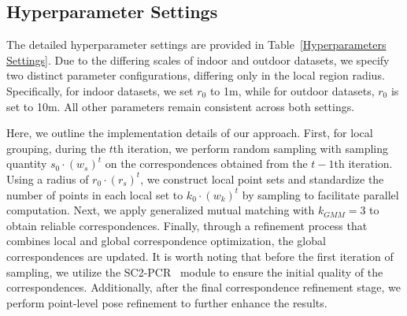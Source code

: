 \subsection{Hyperparameter Settings}

\begin{table}[htbp]
    \centering
    \caption{Hyperparameter settings in different datasets. }
    \label{Hyperparameters Settings}
\end{table}

The detailed hyperparameter settings are provided in Table~\ref{Hyperparameters Settings}. Due to the differing scales of indoor and outdoor datasets, we specify two distinct parameter configurations, differing only in the local region radius. Specifically, for indoor datasets, we set $r_0$ to 1m, while for outdoor datasets, $r_0$ is set to 10m. All other parameters remain consistent across both settings.

Here, we outline the implementation details of our approach. First, for local grouping, during the
$t$th iteration, we perform random sampling with sampling quantity
${s_0}\cdot{(w_s)^{t}}$ on the correspondences obtained from the $t-1$th iteration. Using a radius of ${r_0}\cdot{(r_s)^t}$, we construct local point sets and standardize the number of points in each local set to ${k_0}\cdot{(w_k)^{t}}$ by sampling to facilitate parallel computation. Next, we apply generalized mutual matching with 
$k_{GMM}=3$ to obtain reliable correspondences. Finally, through a refinement process that combines local and global correspondence optimization, the global correspondences are updated.
It is worth noting that before the first iteration of sampling, we utilize the SC2-PCR~\cite{chen2022sc2} module to ensure the initial quality of the correspondences. Additionally, after the final correspondence refinement stage, we perform point-level pose refinement to further enhance the results.

